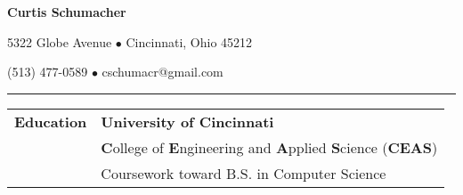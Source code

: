 \documentclass[11pt]{article} %
\begin{document}
	\huge{\centerline{\textbf{Curtis Schumacher}}}
	\large
	\centerline{5322 Globe Avenue $\bullet$ Cincinnati, Ohio 45212}
	\centerline{(513) 477-0589 $\bullet$ cschumacr@gmail.com}
	\vspace*{.75\baselineskip}\hrule\vspace*{1\baselineskip}
\begin{small}	
	\begin{tabular}[t]{p{3cm} p{16cm}}\large{\textbf{Education}}
    				& \textbf{University of Cincinnati} \color{gray}{Fall 2010 - Winter 2016}\\
    				& \textbf{C}ollege of \textbf{E}ngineering and \textbf{A}pplied \textbf{S}cience (\textbf{CEAS}) \\
    				& Coursework toward B.S. in Computer Science \\
			\end{tabular}
			

\end{small}
\end{document}
